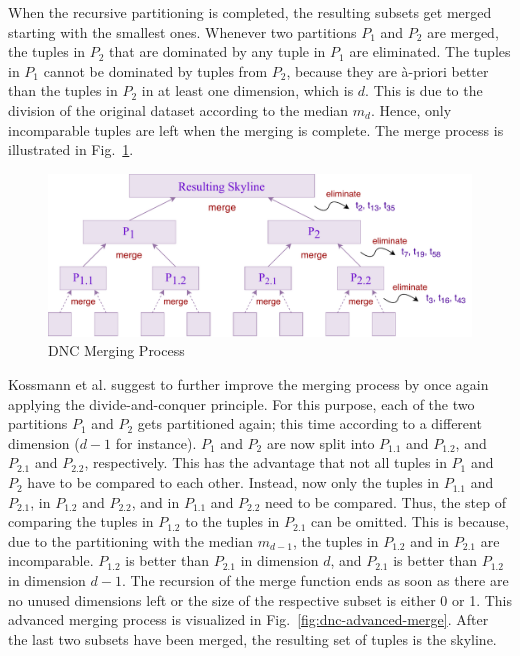 When the recursive partitioning is completed, the resulting subsets get merged starting with the smallest ones. Whenever two partitions $P_{1}$ and $P_{2}$ are merged, the tuples in $P_{2}$ that are dominated by any tuple in $P_{1}$ are eliminated. The tuples in $P_{1}$ cannot be dominated by tuples from $P_{2}$, because they are \`{a}-priori better than the tuples in $P_{2}$ in at least one dimension, which is $d$. This is due to the division of the original dataset according to the median $m_{d}$. Hence, only incomparable tuples are left when the merging is complete. 
The merge process is illustrated in Fig.~\ref{fig:dnc-merging}. 

\begin{figure}[h]
\centering
\includegraphics[width=0.9\linewidth]{figures/dnc-merging}
\caption{DNC Merging Process}
\label{fig:dnc-merging}
\end{figure}

Kossmann et al. \cite{kossmann} suggest to further improve the merging process by once again applying the divide-and-conquer principle. For this purpose, each of the two partitions $P_{1}$ and $P_{2}$ gets partitioned again; this time according to a different dimension ($d-1$ for instance). $P_{1}$ and $P_{2}$ are now split into $P_{1.1}$ and $P_{1.2}$, and $P_{2.1}$ and $P_{2.2}$, respectively. This has the advantage that not all tuples in $P_{1}$ and $P_{2}$ have to be compared to each other. Instead, now only the tuples in $P_{1.1}$ and $P_{2.1}$, in $P_{1.2}$ and $P_{2.2}$, and in $P_{1.1}$ and $P_{2.2}$ need to be compared. Thus, the step of comparing the tuples in $P_{1.2}$ to the tuples in $P_{2.1}$ can be omitted. This is because, due to the partitioning with the median $m_{d-1}$, the tuples in $P_{1.2}$ and in $P_{2.1}$ are incomparable. $P_{1.2}$ is better than $P_{2.1}$ in dimension $d$, and $P_{2.1}$ is better than $P_{1.2}$ in dimension $d-1$. The recursion of the merge function ends as soon as there are no unused dimensions left or the size of the respective subset is either 0 or 1. 
This advanced merging process is visualized in Fig.~\ref{fig:dnc-advanced-merge}. After the last two subsets have been merged, the resulting set of tuples is the skyline. 

